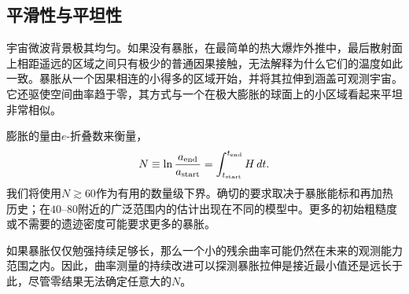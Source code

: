 \subsection{平滑性与平坦性}

宇宙微波背景极其均匀。如果没有暴胀，在最简单的热大爆炸外推中，最后散射面上相距遥远的区域之间只有极少的普通因果接触，无法解释为什么它们的温度如此一致。暴胀从一个因果相连的小得多的区域开始，并将其拉伸到涵盖可观测宇宙。它还驱使空间曲率趋于零，其方式与一个在极大膨胀的球面上的小区域看起来平坦非常相似。

膨胀的量由\(e\)-折叠数来衡量，
\begin{equation}
N\equiv \ln\frac{a_{\rm end}}{a_{\rm start}}
=\int_{t_{\rm start}}^{t_{\rm end}}H\,dt.
\label{eq:c09-efolds}
\end{equation}
我们将使用\(N\gtrsim60\)作为有用的数量级下界。确切的要求取决于暴胀能标和再加热历史；在\(40\)--\(80\)附近的广泛范围内的估计出现在不同的模型中。更多的初始粗糙度或不需要的遗迹密度可能要求更多的暴胀。

\begin{classroomqa}
\end{classroomqa}

\begin{classroomqa}
\end{classroomqa}

如果暴胀仅仅勉强持续足够长，那么一个小的残余曲率可能仍然在未来的观测能力范围之内。因此，曲率测量的持续改进可以探测暴胀拉伸是接近最小值还是远长于此，尽管零结果无法确定任意大的\(N\)。

\begin{classroomqa}
\end{classroomqa}

